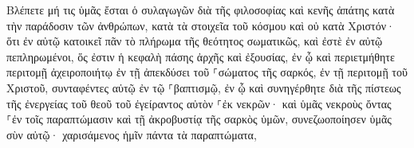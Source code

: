\documentclass{openreader}
\begin{document}
Βλέπετε μή τις ὑμᾶς ἔσται ὁ συλαγωγῶν διὰ τῆς φιλοσοφίας καὶ κενῆς ἀπάτης κατὰ τὴν παράδοσιν τῶν ἀνθρώπων, κατὰ τὰ στοιχεῖα τοῦ κόσμου καὶ οὐ κατὰ Χριστόν· 
ὅτι ἐν αὐτῷ κατοικεῖ πᾶν τὸ πλήρωμα τῆς θεότητος σωματικῶς, 
καὶ ἐστὲ ἐν αὐτῷ πεπληρωμένοι, ὅς ἐστιν ἡ κεφαλὴ πάσης ἀρχῆς καὶ ἐξουσίας, 
ἐν ᾧ καὶ περιετμήθητε περιτομῇ ἀχειροποιήτῳ ἐν τῇ ἀπεκδύσει τοῦ ⸀σώματος τῆς σαρκός, ἐν τῇ περιτομῇ τοῦ Χριστοῦ, 
συνταφέντες αὐτῷ ἐν τῷ ⸀βαπτισμῷ, ἐν ᾧ καὶ συνηγέρθητε διὰ τῆς πίστεως τῆς ἐνεργείας τοῦ θεοῦ τοῦ ἐγείραντος αὐτὸν ⸀ἐκ νεκρῶν· 
καὶ ὑμᾶς νεκροὺς ὄντας ⸀ἐν τοῖς παραπτώμασιν καὶ τῇ ἀκροβυστίᾳ τῆς σαρκὸς ὑμῶν, συνεζωοποίησεν ὑμᾶς σὺν αὐτῷ· χαρισάμενος ἡμῖν πάντα τὰ παραπτώματα, 
\end{document}
